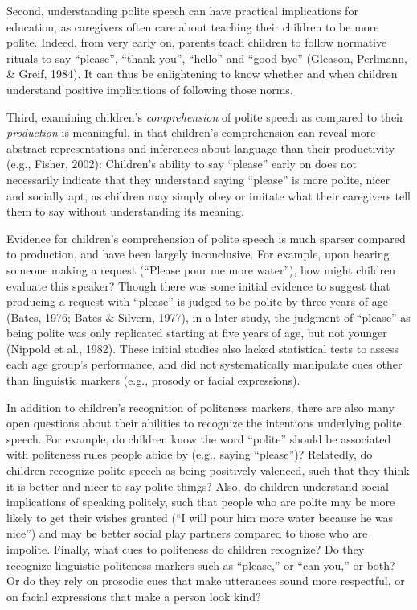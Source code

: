 \documentclass[10pt, letterpaper]{article}
\begin{document}
Second, understanding polite speech can have practical implications for
education, as caregivers often care about teaching their children to be
more polite. Indeed, from very early on, parents teach children to
follow normative rituals to say ``please'', ``thank you'', ``hello'' and
``good-bye'' (Gleason, Perlmann, \& Greif, 1984). It can thus be
enlightening to know whether and when children understand positive
implications of following those norms.

Third, examining children's \emph{comprehension} of polite speech as
compared to their \emph{production} is meaningful, in that children's
comprehension can reveal more abstract representations and inferences
about language than their productivity (e.g., Fisher, 2002): Children's
ability to say ``please'' early on does not necessarily indicate that
they understand saying ``please'' is more polite, nicer and socially
apt, as children may simply obey or imitate what their caregivers tell
them to say without understanding its meaning.

Evidence for children's comprehension of polite speech is much sparser
compared to production, and have been largely inconclusive. For example,
upon hearing someone making a request (``Please pour me more water''),
how might children evaluate this speaker? Though there was some initial
evidence to suggest that producing a request with ``please'' is judged
to be polite by three years of age (Bates, 1976; Bates \& Silvern,
1977), in a later study, the judgment of ``please'' as being polite was
only replicated starting at five years of age, but not younger (Nippold
et al., 1982). These initial studies also lacked statistical tests to
assess each age group's performance, and did not systematically
manipulate cues other than linguistic markers (e.g., prosody or facial
expressions).

In addition to children's recognition of politeness markers, there are
also many open questions about their abilities to recognize the
intentions underlying polite speech. For example, do children know the
word ``polite'' should be associated with politeness rules people abide
by (e.g., saying ``please'')? Relatedly, do children recognize polite
speech as being positively valenced, such that they think it is better
and nicer to say polite things? Also, do children understand social
implications of speaking politely, such that people who are polite may
be more likely to get their wishes granted (``I will pour him more water
because he was nice'') and may be better social play partners compared
to those who are impolite. Finally, what cues to politeness do children
recognize? Do they recognize linguistic politeness markers such as
``please,'' or ``can you,'' or both? Or do they rely on prosodic cues
that make utterances sound more respectful, or on facial expressions
that make a person look kind?
\end{document}
